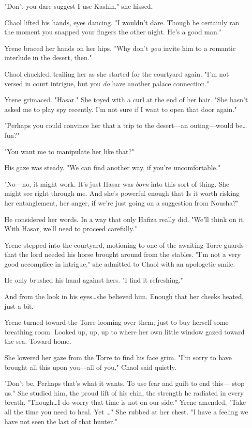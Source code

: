 "Don't you dare suggest I use Kashin," she hissed.

Chaol lifted his hands, eyes dancing.
"I wouldn't dare.
Though he certainly ran the moment you snapped your fingers the other night.
He's a good man."

Yrene braced her hands on her hips.
"Why don't \emph{you} invite him to a romantic interlude in the desert, then."

Chaol chuckled, trailing her as she started for the courtyard again.
"I'm not versed in court intrigue, but you \emph{do} have another palace connection."

Yrene grimaced.
"Hasar."
She toyed with a curl at the end of her hair.
"She hasn't asked me to play spy recently.
I'm not sure if I want to  open that door again."

"Perhaps you could convince her that a trip to the desert---an outing---would be\ldots fun?"

"You want me to manipulate her like that?"

His gaze was steady.
"We can find another way, if you're uncomfortable."

"No---no, it might work.
It's just Hasar was \emph{born} into this sort of thing.
She might see right through me.
And she's powerful enough that  Is it worth risking her entanglement, her anger, if we're just going on a suggestion from Nousha?"

He considered her words.
In a way that only Hafiza really did.
"We'll think on it.
With Hasar, we'll need to proceed carefully."

Yrene stepped into the courtyard, motioning to one of the awaiting Torre guards that the lord needed his horse brought around from the stables.
"I'm not a very good accomplice in intrigue," she admitted to Chaol with an apologetic smile.

He only brushed his hand against hers.
"I find it refreshing."

And from the look in his eyes\ldots she believed him.
Enough that her cheeks heated, just a bit.

Yrene turned toward the Torre looming over them, just to buy herself some breathing room.
Looked up, up, up to where her own little window gazed toward the sea.
Toward home.

She lowered her gaze from the Torre to find his face grim.
"I'm sorry to have brought all this upon you---all of you," Chaol said quietly.

"Don't be.
Perhaps that's what it wants.
To use fear and guilt to end this--- stop us."
She studied him, the proud lift of his chin, the strength he radiated in every breath.
"Though\ldots I do worry that time is not on our side."
Yrene amended, "Take all the time you need to heal.
Yet \ldots" She rubbed at her chest.
"I have a feeling we have not seen the last of that hunter."

